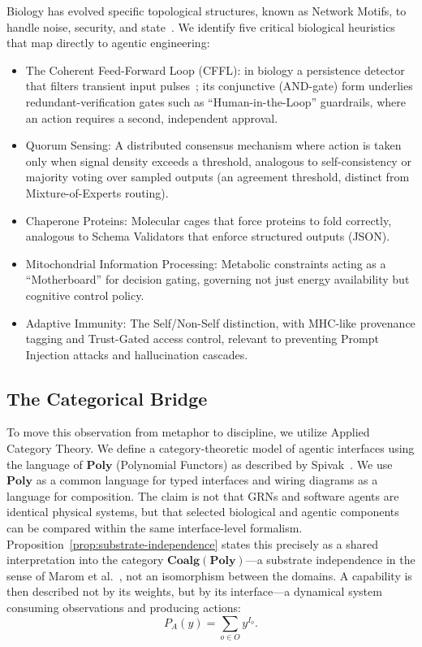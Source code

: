 Biology has evolved specific topological structures, known as Network Motifs, to handle noise, security,
and state~\cite{milo2002network}. We identify five critical biological heuristics that map directly to agentic engineering:
\begin{itemize}[leftmargin=*]
\item The Coherent Feed-Forward Loop (CFFL): in biology a persistence detector that filters transient input
pulses~\cite{alon2007network}; its conjunctive (AND-gate) form underlies redundant-verification gates such as
``Human-in-the-Loop'' guardrails, where an action requires a second, independent approval.
\item Quorum Sensing: A distributed consensus mechanism where action is taken only when signal density
exceeds a threshold, analogous to self-consistency or majority voting over sampled outputs (an agreement
threshold, distinct from Mixture-of-Experts routing).
\item Chaperone Proteins: Molecular cages that force proteins to fold correctly, analogous to Schema
Validators that enforce structured outputs (JSON).
\item Mitochondrial Information Processing: Metabolic constraints acting as a ``Motherboard'' for
decision gating, governing not just energy availability but cognitive control policy.
\item Adaptive Immunity: The Self/Non-Self distinction, with MHC-like provenance tagging and Trust-Gated
access control, relevant to preventing Prompt Injection attacks and hallucination cascades.
\end{itemize}

\subsection{The Categorical Bridge}

To move this observation from metaphor to discipline, we utilize Applied Category Theory. We define a
category-theoretic model of agentic interfaces using the language of $\mathbf{Poly}$ (Polynomial Functors)
as described by Spivak~\cite{spivak2021learners}.
We use $\mathbf{Poly}$ as a common language for typed interfaces and wiring diagrams as a language for
composition. The claim is not that GRNs and software agents are identical physical systems, but that
selected biological and agentic components can be compared within the same interface-level formalism.
Proposition~\ref{prop:substrate-independence} states this precisely as a shared interpretation into the
category $\mathbf{Coalg}(\mathbf{Poly})$---a substrate independence in the sense of Marom
et al.~\cite{marom2026category}, not an isomorphism between the domains.
A capability is then described not by its weights, but by its interface---a dynamical system consuming
observations and producing actions:
\begin{equation}
P_A(y) = \sum_{o\in O} y^{I_o}.
\label{eq:poly-functor-agent}
\end{equation}

